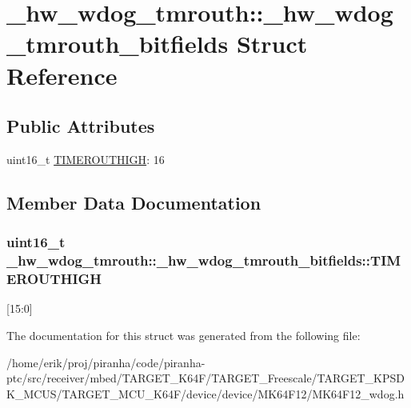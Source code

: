 \hypertarget{struct__hw__wdog__tmrouth_1_1__hw__wdog__tmrouth__bitfields}{}\section{\+\_\+hw\+\_\+wdog\+\_\+tmrouth\+:\+:\+\_\+hw\+\_\+wdog\+\_\+tmrouth\+\_\+bitfields Struct Reference}
\label{struct__hw__wdog__tmrouth_1_1__hw__wdog__tmrouth__bitfields}
\subsection*{Public Attributes}
\begin{DoxyCompactItemize}
\item 
uint16\+\_\+t \hyperlink{struct__hw__wdog__tmrouth_1_1__hw__wdog__tmrouth__bitfields_a9ab261f8e66b4f0c861c351e620ce92a}{T\+I\+M\+E\+R\+O\+U\+T\+H\+I\+GH}\+: 16
\end{DoxyCompactItemize}


\subsection{Member Data Documentation}
\subsubsection[{\texorpdfstring{T\+I\+M\+E\+R\+O\+U\+T\+H\+I\+GH}{TIMEROUTHIGH}}]{\setlength{\rightskip}{0pt plus 5cm}uint16\+\_\+t \+\_\+hw\+\_\+wdog\+\_\+tmrouth\+::\+\_\+hw\+\_\+wdog\+\_\+tmrouth\+\_\+bitfields\+::\+T\+I\+M\+E\+R\+O\+U\+T\+H\+I\+GH}\hypertarget{struct__hw__wdog__tmrouth_1_1__hw__wdog__tmrouth__bitfields_a9ab261f8e66b4f0c861c351e620ce92a}{}\label{struct__hw__wdog__tmrouth_1_1__hw__wdog__tmrouth__bitfields_a9ab261f8e66b4f0c861c351e620ce92a}
\mbox{[}15\+:0\mbox{]} 

The documentation for this struct was generated from the following file\+:\begin{DoxyCompactItemize}
\item 
/home/erik/proj/piranha/code/piranha-\/ptc/src/receiver/mbed/\+T\+A\+R\+G\+E\+T\+\_\+\+K64\+F/\+T\+A\+R\+G\+E\+T\+\_\+\+Freescale/\+T\+A\+R\+G\+E\+T\+\_\+\+K\+P\+S\+D\+K\+\_\+\+M\+C\+U\+S/\+T\+A\+R\+G\+E\+T\+\_\+\+M\+C\+U\+\_\+\+K64\+F/device/device/\+M\+K64\+F12/M\+K64\+F12\+\_\+wdog.\+h\end{DoxyCompactItemize}
